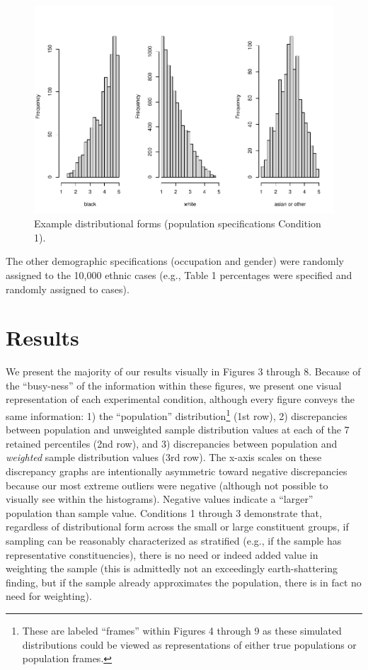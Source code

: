 \documentclass[
  ,man]{apa7}
\begin{document}
\begin{figure}
\centering
\includegraphics{NormsBuilding_files/figure-latex/Figure2-1.pdf}
\caption{\label{fig:Figure2}Example distributional forms (population specifications Condition 1).}
\end{figure}

The other demographic specifications (occupation and gender) were randomly assigned to the 10,000 ethnic cases (e.g., Table 1 percentages were specified and randomly assigned to cases).

\hypertarget{results}{%
\section{Results}\label{results}}

We present the majority of our results visually in Figures 3 through 8. Because of the ``busy-ness'' of the information within these figures, we present one visual representation of each experimental condition, although every figure conveys the same information: 1) the ``population'' distribution\footnote{These are labeled ``frames'' within Figures 4 through 9 as these simulated distributions could be viewed as representations of either true populations or population frames.} (1st row), 2) discrepancies between population and unweighted sample distribution values at each of the 7 retained percentiles (2nd row), and 3) discrepancies between population and \emph{weighted} sample distribution values (3rd row). The x-axis scales on these discrepancy graphs are intentionally asymmetric toward negative discrepancies because our most extreme outliers were negative (although not possible to visually see within the histograms). Negative values indicate a ``larger'' population than sample value. Conditions 1 through 3 demonstrate that, regardless of distributional form across the small or large constituent groups, if sampling can be reasonably characterized as stratified (e.g., if the sample has representative constituencies), there is no need or indeed added value in weighting the sample (this is admittedly not an exceedingly earth-shattering finding, but if the sample already approximates the population, there is in fact no need for weighting).
\end{document}
